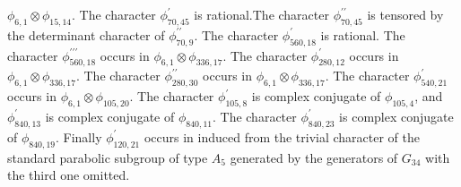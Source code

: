 \begin{itemize}
$\phi_{6,1}\otimes\phi_{15,14}$.  The  character  $\phi_{70,45}^\prime$  is
rational.The  character  $\phi_{70,45}^{\prime\prime}$  is  tensored by the
determinant   character  of   $\phi_{70,9}^{\prime\prime}$.  The  character
$\phi_{560,18}^\prime$ is rational. The character
$\phi_{560,18}^{\prime\prime\prime}$ occurs in
$\phi_{6,1}\otimes\phi_{336,17}$.   The   character  $\phi_{280,12}^\prime$
occurs in $\phi_{6,1}\otimes\phi_{336,17}$. The character
$\phi_{280,30}^{\prime\prime}$  occurs in $\phi_{6,1}\otimes\phi_{336,17}$.
The character $\phi_{540,21}^\prime$ occurs in
$\phi_{6,1}\otimes\phi_{105,20}$.  The  character  $\phi_{105,8}^\prime$ is
complex  conjugate of $\phi_{105,4}$, and $\phi_{840,13}^\prime$ is complex
conjugate  of  $\phi_{840,11}$.  The  character  $\phi_{840,23}^\prime$  is
complex conjugate of $\phi_{840,19}$. Finally $\phi_{120,21}^\prime$ occurs
in induced from the trivial character of the standard parabolic subgroup of
type  $A_5$  generated  by  the  generators  of $G_{34}$ with the third one
omitted.
\end{itemize}

